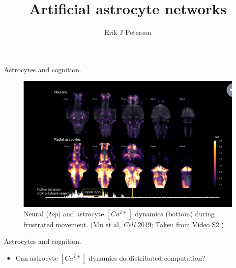 \documentclass[10pt]{beamer}
\title{Artificial astrocyte networks}
\date{}
\author{Erik J Peterson}
\institute{CoAxLab\\Carnegie Mellon University}
\begin{document}
\maketitle


    

\begin{frame}[fragile]{Astrocytes and cognition.}
\begin{figure}
    \centering
    \includegraphics[scale=0.4]{images/mu.png} 
    \caption{Neural (\textit{top}) and astrocyte $[Ca^{2+}]$ dynamics (bottom) during frustrated movement. (Mu et al, \textit{Cell} 2019; Taken from Video S2.)}
\end{figure}
\end{frame}

\begin{frame}[fragile]{Astrocytes and cognition.}
\begin{itemize}
    \item Can astrocyte $[Ca^{2+}]$ dynamics do distributed computation?
\end{itemize}
\end{frame}
\end{document}
